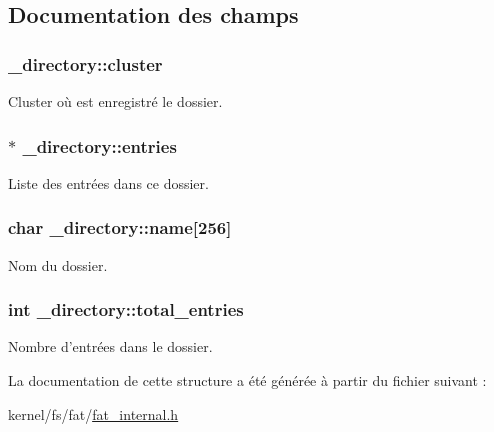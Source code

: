 \subsection{\-Documentation des champs}
\hypertarget{struct__directory_a5a45241095c7fb2a39f158638631ddbc}{
\subsubsection[{cluster}]{ {\bf \-\_\-directory\-::cluster}}}\label{struct__directory_a5a45241095c7fb2a39f158638631ddbc}
\-Cluster où est enregistré le dossier. \hypertarget{struct__directory_a2aa96162372442698a14e116ce88110d}{
\subsubsection[{entries}]{$\ast$ {\bf \-\_\-directory\-::entries}}}\label{struct__directory_a2aa96162372442698a14e116ce88110d}
\-Liste des entrées dans ce dossier. \hypertarget{struct__directory_a535c678fe29215d35ac64200865147a4}{
\subsubsection[{name}]{\setlength{\rightskip}{0pt plus 5cm}char {\bf \-\_\-directory\-::name}\mbox{[}256\mbox{]}}}\label{struct__directory_a535c678fe29215d35ac64200865147a4}
\-Nom du dossier. \hypertarget{struct__directory_aeb73476149e19828774d4dfbd96a051f}{
\subsubsection[{total\-\_\-entries}]{\setlength{\rightskip}{0pt plus 5cm}int {\bf \-\_\-directory\-::total\-\_\-entries}}}\label{struct__directory_aeb73476149e19828774d4dfbd96a051f}
\-Nombre d'entrées dans le dossier. 

\-La documentation de cette structure a été générée à partir du fichier suivant \-:\begin{DoxyCompactItemize}
\item 
kernel/fs/fat/\hyperlink{fat__internal_8h}{fat\-\_\-internal.\-h}\end{DoxyCompactItemize}
